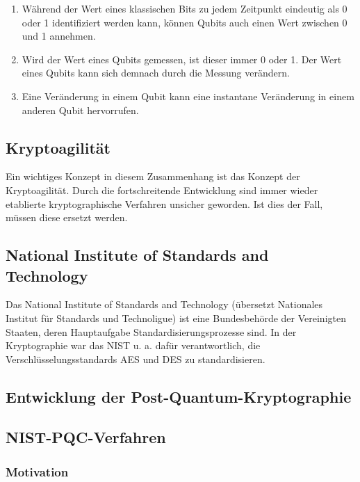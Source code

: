 		\begin{enumerate}
			\item Während der Wert eines klassischen Bits zu jedem Zeitpunkt eindeutig als 0 oder 1 identifiziert werden kann, können Qubits auch einen Wert zwischen 0 und 1 annehmen.
			\item Wird der Wert eines Qubits gemessen, ist dieser immer 0 oder 1. Der Wert eines Qubits kann sich demnach durch die Messung verändern.
			\item Eine Veränderung in einem Qubit kann eine instantane Veränderung in einem anderen Qubit hervorrufen.
		\end{enumerate}
	
		\subsection{Kryptoagilität}
		\label{subsec:grundlagen:pqc:agil}
		
		Ein wichtiges Konzept in diesem Zusammenhang ist das Konzept der Kryptoagilität. Durch die fortschreitende Entwicklung sind immer wieder etablierte kryptographische Verfahren unsicher geworden. Ist dies der Fall, müssen diese ersetzt werden.
	
		\subsection{National Institute of Standards and Technology}
		\label{subsec:grundlagen:pqc:nist}
		
		Das National Institute of Standards and Technology (übersetzt Nationales Institut für Standards und Technoligue) ist eine Bundesbehörde der Vereinigten Staaten, deren Hauptaufgabe Standardisierungsprozesse sind. In der Kryptographie war das NIST u. a. dafür verantwortlich, die Verschlüsselungsstandards \ac{AES} und \Ac{DES} zu standardisieren.
		
		\subsection{Entwicklung der Post-Quantum-Kryptographie}
		\label{subsec:grundlagen:pqc:entwicklung}
		
		\subsection{NIST-PQC-Verfahren}
		\label{subsec:grundlagen:pqc:verfahren}
		
			\subsubsection{Motivation}
			\label{subsubsec:grundlagen:pqc:verfahren:motivation}
			
